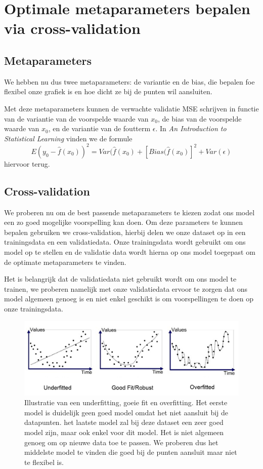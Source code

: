 \documentclass[TeamE-eindrapport]{subfiles}
\begin{document}
	
	\section{Optimale metaparameters bepalen via cross-validation}
	
	\subsection{Metaparameters}
	
	We hebben nu dus twee metaparameters: de variantie en de bias, die bepalen foe flexibel onze grafiek is en hoe dicht ze bij de punten wil aansluiten.	
	
	Met deze metaparameters kunnen de verwachte validatie MSE schrijven in functie van de variantie van de voorspelde waarde van \(x_{0}\), de bias van de voorspelde waarde van \(x_{0}\), en de variantie van de foutterm \(\epsilon\). In \textit{An Introduction to Statistical Learning} \cite{james2023introduction} vinden we de formule \[E(y_{0} - \hat{f}(x_{0}))^{2} = Var(\hat{f}(x_{0}) + [Bias(\hat{f}(x_{0})]^{2} + Var(\epsilon)\] hiervoor terug.
	
	\subsection{Cross-validation}
	
	We proberen nu om de best passende metaparameters te kiezen zodat ons model een zo goed mogelijke voorspelling kan doen. Om deze parameters te kunnen bepalen gebruiken we cross-validation, hierbij delen we onze dataset op in een trainingsdata en een validatiedata. Onze trainingsdata wordt gebruikt om ons model op te stellen en de validatie data wordt hierna op ons model toegepast om de optimate metaparameters te vinden. 
	
	Het is belangrijk dat de validatiedata niet gebruikt wordt om ons model te trainen, we proberen namelijk met onze validatiedata ervoor te zorgen dat ons model algemeen genoeg is en niet enkel geschikt is om voorspellingen te doen op onze trainingsdata. 
	
	\begin{figure}[h!]
		\centering
		\includegraphics[width=.8\textwidth]{fitting}
		\caption{Illustratie van een underfitting, goeie fit en overfitting. Het eerste  model is duidelijk geen goed model omdat het niet aansluit bij de datapunten. het laatste model zal bij deze dataset een zeer goed model zijn, maar ook enkel voor dit model. Het is niet algemeen genoeg om op nieuwe data toe te passen. We proberen dus het middelste model te vinden die goed bij de punten aansluit maar niet te flexibel is.\cite{Bhande_2018}}
		\label{fig:fitting}
	\end{figure}
	
\end{document}
